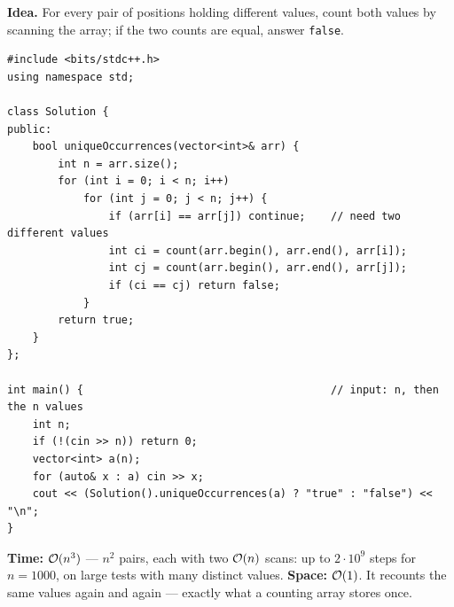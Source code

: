 \begin{bruteforcebox}
\textbf{Idea.} For every pair of positions holding different values, count both values by scanning the array; if the two counts are equal, answer \texttt{false}.
\begin{lstlisting}[style=cpp]
#include <bits/stdc++.h>
using namespace std;

class Solution {
public:
    bool uniqueOccurrences(vector<int>& arr) {
        int n = arr.size();
        for (int i = 0; i < n; i++)
            for (int j = 0; j < n; j++) {
                if (arr[i] == arr[j]) continue;    // need two different values
                int ci = count(arr.begin(), arr.end(), arr[i]);
                int cj = count(arr.begin(), arr.end(), arr[j]);
                if (ci == cj) return false;
            }
        return true;
    }
};

int main() {                                       // input: n, then the n values
    int n;
    if (!(cin >> n)) return 0;
    vector<int> a(n);
    for (auto& x : a) cin >> x;
    cout << (Solution().uniqueOccurrences(a) ? "true" : "false") << "\n";
}
\end{lstlisting}
\begin{complexitybox}
\textbf{Time:} $\mathcal{O}(n^3)$ --- $n^2$ pairs, each with two $\mathcal{O}(n)$ scans: up to $2\cdot10^9$ steps for $n = 1000$, \tle{} on large tests with many distinct values. \textbf{Space:} $\mathcal{O}(1)$. It recounts the same values again and again --- exactly what a counting array stores once.
\end{complexitybox}
\end{bruteforcebox}

